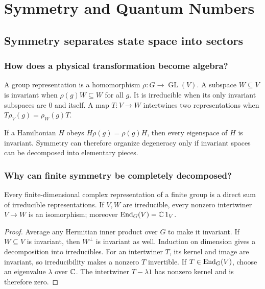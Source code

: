 \part{Symmetry and Quantum Numbers}

\chapter{Symmetry separates state space into sectors}
\label{ch:representations}



\section{How does a physical transformation become algebra?}

A group representation is a homomorphism
$\rho:G\to\operatorname{GL}(V)$.  A subspace $W\subseteq V$ is invariant
when $\rho(g)W\subseteq W$ for all $g$.  It is irreducible when its only
invariant subspaces are $0$ and itself.  A map $T:V\to W$ intertwines two
representations when $T\rho_V(g)=\rho_W(g)T$.

If a Hamiltonian $H$ obeys $H\rho(g)=\rho(g)H$, then every eigenspace of $H$
is invariant.  Symmetry can therefore organize degeneracy only if invariant
spaces can be decomposed into elementary pieces.

\section{Why can finite symmetry be completely decomposed?}

\begin{theorem}
Every finite-dimensional complex representation of a finite group is a direct
sum of irreducible representations.  If $V,W$ are irreducible, every nonzero
intertwiner $V\to W$ is an isomorphism; moreover
$\operatorname{End}_G(V)=\mathbb C\,1_V$.
\end{theorem}

\begin{proof}
Average any Hermitian inner product over $G$ to make it invariant.  If
$W\subseteq V$ is invariant, then $W^\perp$ is invariant as well.  Induction
on dimension gives a decomposition into irreducibles.  For an intertwiner
$T$, its kernel and image are invariant, so irreducibility makes a nonzero
$T$ invertible.  If $T\in\operatorname{End}_G(V)$, choose an eigenvalue $\lambda$ over
$\mathbb C$.  The intertwiner $T-\lambda1$ has nonzero kernel and is therefore zero.
\end{proof}

